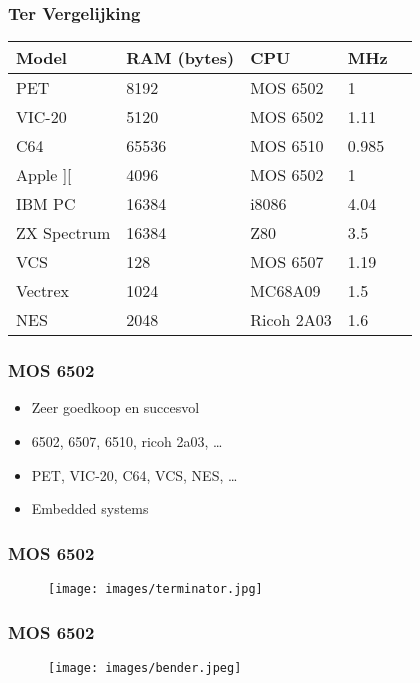 \documentclass[aspectratio=43]{uva-inf-presentation}
\begin{document}
\begin{frame}
\frametitle{Ter Vergelijking}

\begin{tabular}{|l|l|l|l|l|}
\hline Model & RAM (bytes) & CPU & MHz \\ \hline
PET & 8192 & MOS 6502 & 1 \\
VIC-20 & 5120 & MOS 6502 & 1.11 \\
C64 & 65536 & MOS 6510 & 0.985 \\ \hline
Apple ][ & 4096 & MOS 6502 & 1 \\
IBM PC & 16384 & i8086 & 4.04 \\
ZX Spectrum & 16384 & Z80 & 3.5 \\ \hline
VCS & 128 & MOS 6507 & 1.19 \\
Vectrex & 1024 & MC68A09 & 1.5 \\
NES & 2048 & Ricoh 2A03 & 1.6 \\ \hline
\end{tabular}

\end{frame}


\begin{frame}
\frametitle{MOS 6502}

\begin{itemize}
\item Zeer goedkoop en succesvol
\item 6502, 6507, 6510, ricoh 2a03, \dots
\item PET, VIC-20, C64, VCS, NES, \dots
\item Embedded systems
\end{itemize}

\end{frame}


\begin{frame}
\frametitle{MOS 6502}

\begin{figure}
\texttt{[image: images/terminator.jpg]}
\end{figure}

\end{frame}


\begin{frame}
\frametitle{MOS 6502}

\begin{figure}
\texttt{[image: images/bender.jpeg]}
\end{figure}

\end{frame}
\end{document}
